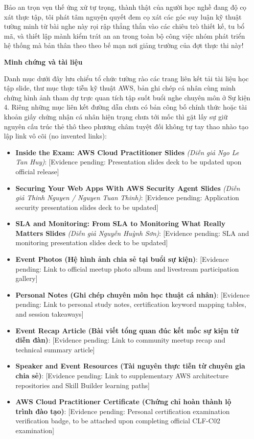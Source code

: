 Bảo an trọn vẹn thế ứng xử tự trọng, thành thật của người học nghề đang
độ cọ xát thực tập, tôi phát tâm nguyện quyết đem cọ xát các góc suy
luận kỹ thuật tường minh từ bài nghe này rọi rập thẳng thắn vào các
chiêu trò thiết kế, tu bổ mã, và thiết lập mành kiểm trát an an trong
toàn bộ công việc nhóm phát triển hệ thống mà bản thân theo theo bế mạn
nơi giảng trường của đợt thực thi này!

\vspace{0.5em}\noindent\textbf{Minh chứng và tài
liệu}\par

Danh mục dưới đây lưu chiểu tổ chức tường rào các trang liên kết tải tài
liệu học tập slide, thư mục thực tiễn kỹ thuật AWS, bản ghi chép cá nhân
cùng minh chứng hình ảnh tham dự trực quan tích tập suốt buổi nghe
chuyên môn ở Sự kiện 4. Riêng những mục liên kết đường dẫn chưa có bản
công bố chính thức hoặc tài khoản giấy chứng nhận cá nhân hiện trạng
chưa tới mốc thì gặt lấy sự giữ nguyên cấu trúc thẻ thô theo phương châm
tuyệt đối không tự tay thao nhào tạo lập link vô cõi (no invented
links):

\begin{itemize}
\tightlist
\item
  \textbf{Inside the Exam: AWS Cloud Practitioner Slides} \emph{(Diễn
  giả Ngo Le Tan Huy)}: {[}Evidence pending: Presentation slides deck to
  be updated upon official release{]}
\item
  \textbf{Securing Your Web Apps With AWS Security Agent Slides}
  \emph{(Diễn giả Thinh Nguyen / Nguyen Tuan Thinh)}: {[}Evidence
  pending: Application security presentation slides deck to be
  updated{]}
\item
  \textbf{SLA and Monitoring: From SLA to Monitoring What Really Matters
  Slides} \emph{(Diễn giả Nguyễn Huỳnh Sơn)}: {[}Evidence pending: SLA
  and monitoring presentation slides deck to be updated{]}
\item
  \textbf{Event Photos (Hệ hình ảnh chia sẻ tại buổi sự kiện)}:
  {[}Evidence pending: Link to official meetup photo album and
  livestream participation gallery{]}
\item
  \textbf{Personal Notes (Ghi chép chuyên môn học thuật cá nhân)}:
  {[}Evidence pending: Link to personal study notes, certification
  keyword mapping tables, and session takeaways{]}
\item
  \textbf{Event Recap Article (Bài viết tổng quan đúc kết mốc sự kiện từ
  diễn đàn)}: {[}Evidence pending: Link to community meetup recap and
  technical summary article{]}
\item
  \textbf{Speaker and Event Resources (Tài nguyên thực tiễn từ chuyên
  gia chia sẻ)}: {[}Evidence pending: Link to supplementary AWS
  architecture repositories and Skill Builder learning paths{]}
\item
  \textbf{AWS Cloud Practitioner Certificate (Chứng chỉ hoàn thành lộ
  trình đào tạo)}: {[}Evidence pending: Personal certification
  examination verification badge, to be attached upon completing
  official CLF-C02 examination{]}
\end{itemize}


